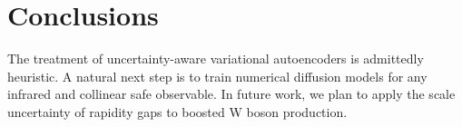 \section{Conclusions}\label{sec:conclusions}

The treatment of uncertainty-aware variational autoencoders is
admittedly heuristic. A natural next step is to train numerical
diffusion models for any infrared and collinear safe observable. In
future work, we plan to apply the scale uncertainty of rapidity gaps to
boosted W boson production.

